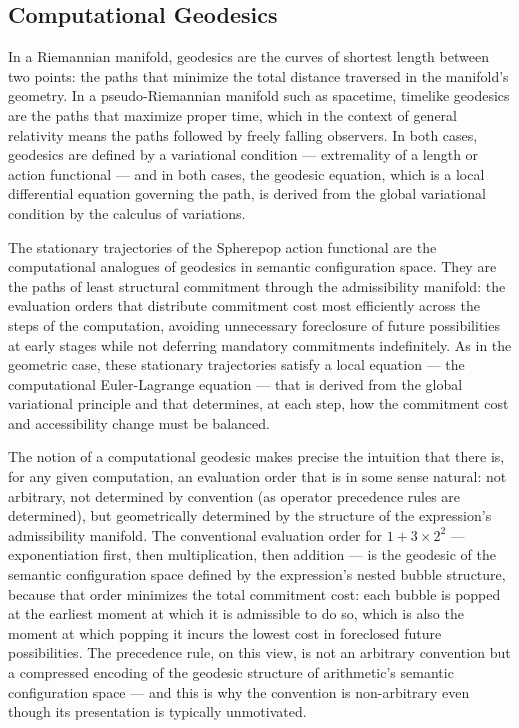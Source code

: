 \documentclass[12pt,openany]{book}
\theoremstyle{plain}
\theoremstyle{definition}
\theoremstyle{remark}
\begin{document}
\subsection{Computational Geodesics}

In a Riemannian manifold, geodesics are the curves of shortest length between two points: the paths that minimize the total distance traversed in the manifold's geometry. In a pseudo-Riemannian manifold such as spacetime, timelike geodesics are the paths that maximize proper time, which in the context of general relativity means the paths followed by freely falling observers. In both cases, geodesics are defined by a variational condition — extremality of a length or action functional — and in both cases, the geodesic equation, which is a local differential equation governing the path, is derived from the global variational condition by the calculus of variations.

The stationary trajectories of the Spherepop action functional are the computational analogues of geodesics in semantic configuration space. They are the paths of least structural commitment through the admissibility manifold: the evaluation orders that distribute commitment cost most efficiently across the steps of the computation, avoiding unnecessary foreclosure of future possibilities at early stages while not deferring mandatory commitments indefinitely. As in the geometric case, these stationary trajectories satisfy a local equation — the computational Euler-Lagrange equation — that is derived from the global variational principle and that determines, at each step, how the commitment cost and accessibility change must be balanced.

The notion of a computational geodesic makes precise the intuition that there is, for any given computation, an evaluation order that is in some sense natural: not arbitrary, not determined by convention (as operator precedence rules are determined), but geometrically determined by the structure of the expression's admissibility manifold. The conventional evaluation order for $1 + 3 \times 2^2$ — exponentiation first, then multiplication, then addition — is the geodesic of the semantic configuration space defined by the expression's nested bubble structure, because that order minimizes the total commitment cost: each bubble is popped at the earliest moment at which it is admissible to do so, which is also the moment at which popping it incurs the lowest cost in foreclosed future possibilities. The precedence rule, on this view, is not an arbitrary convention but a compressed encoding of the geodesic structure of arithmetic's semantic configuration space — and this is why the convention is non-arbitrary even though its presentation is typically unmotivated.
\end{document}
